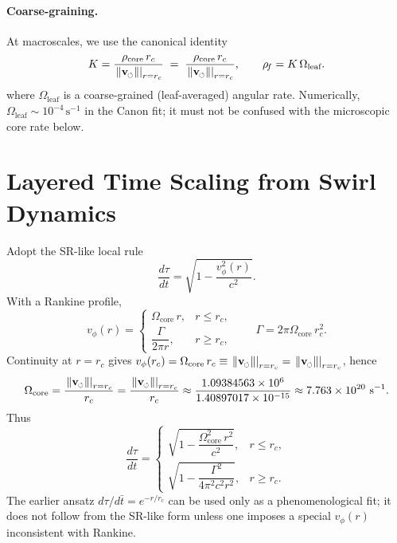 \documentclass[11pt]{article}
\newcommand{\swirlarrow}{%
	\mathchoice{\mkern-2mu\scriptstyle\boldsymbol{\circlearrowleft}}%
	{\mkern-2mu\scriptstyle\boldsymbol{\circlearrowleft}}%
	{\mkern-2mu\scriptscriptstyle\boldsymbol{\circlearrowleft}}%
	{\mkern-2mu\scriptscriptstyle\boldsymbol{\circlearrowleft}}%
}
\newcommand{\vswirl}{\mathbf{v}_{\swirlarrow}}
\newcommand{\vscore}{v_s}                                %
\newcommand{\vnorm}{\lVert \vswirl \rVert}               %
\newcommand{\rhoF}{\rho_{\!f}}                           %
\newcommand{\rhoC}{\rho_{\mathrm{core}}} %
\providecommand{\rc}{r_c} %
\newcommand{\vcore}{\left.\vnorm\right|_{r=\rc}}        %
\renewcommand{\vscore}{\vcore}
\begin{document}
	\paragraph{Coarse-graining.}
	At macroscales, we use the canonical identity
	\[
		K=\frac{\rhoC\,r_c}{\vscore}\;=\;\frac{\rhoC\,\rc}{\left.\vnorm\right|_{r=\rc}},\qquad \rhoF=K\,\Omega_{\text{leaf}}.
	\]
	where $\Omega_{\text{leaf}}$ is a coarse-grained (leaf-averaged) angular rate. Numerically, $\Omega_{\text{leaf}}\sim 10^{-4}\,\mathrm{s^{-1}}$ in the Canon fit; it must not be confused with the microscopic core rate below.

	\section{Layered Time Scaling from Swirl Dynamics}
	Adopt the SR-like local rule
	\[
		\frac{d\tau}{dt}=\sqrt{1-\frac{v_\phi^{2}(r)}{c^{2}}}.
	\]
	With a Rankine profile,
	\[
		v_\phi(r)=
		\begin{cases}
			\Omega_{\text{core}}\,r, & r\le r_c,\\[4pt]
			\dfrac{\Gamma}{2\pi r}, & r\ge r_c,
		\end{cases}
		\qquad \Gamma=2\pi\Omega_{\text{core}}\,r_c^{2}.
	\]
	Continuity at $r=r_c$ gives $v_\phi(r_c)=\Omega_{\text{core}}\,r_c\equiv \vscore=\left.\vnorm\right|_{r=\rc}$, hence
	\[
		\Omega_{\text{core}}=\frac{\vscore}{r_c}=\frac{\left.\vnorm\right|_{r=\rc}}{\rc}\approx \frac{1.09384563\times 10^{6}}{1.40897017\times 10^{-15}}
		\approx 7.763\times 10^{20}\ \mathrm{s^{-1}}.
	\]
	Thus
	\[
		\frac{d\tau}{dt}=
		\begin{cases}
			\sqrt{1-\dfrac{\Omega_{\text{core}}^{2}\,r^{2}}{c^{2}}}, & r\le r_c,\\[6pt]
			\sqrt{1-\dfrac{\Gamma^{2}}{4\pi^{2}c^{2}r^{2}}}, & r\ge r_c.
		\end{cases}
	\]
	The earlier ansatz $d\tau/d\bar t=e^{-r/r_c}$ can be used only as a phenomenological fit; it does not follow from the SR-like form unless one imposes a special $v_\phi(r)$ inconsistent with Rankine.



	
	
\end{document}
